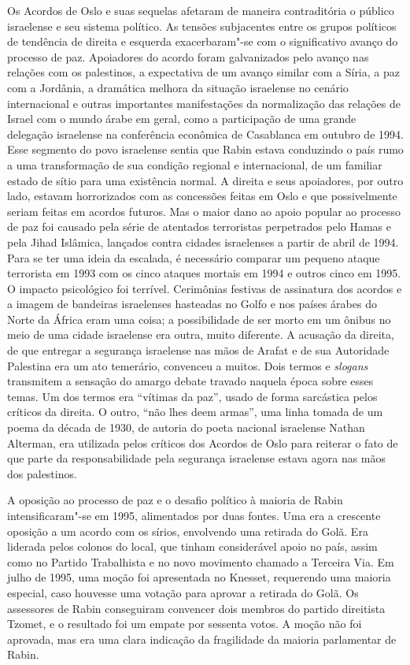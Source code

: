 Os Acordos de Oslo e suas sequelas afetaram de maneira contraditória o
público israelense e seu sistema político. As tensões subjacentes entre
os grupos políticos de tendência de direita e esquerda exacerbaram"-se
com o significativo avanço do processo de paz. Apoiadores do acordo
foram galvanizados pelo avanço nas relações com os palestinos, a
expectativa de um avanço similar com a Síria, a paz com a Jordânia, a
dramática melhora da situação israelense no cenário internacional e
outras importantes manifestações da normalização das relações de Israel
com o mundo árabe em geral, como a participação de uma grande delegação
israelense na conferência econômica de Casablanca em outubro de 1994.
Esse segmento do povo israelense sentia que Rabin estava conduzindo o
país rumo a uma transformação de sua condição regional e internacional,
de um familiar estado de sítio para uma existência normal. A direita e
seus apoiadores, por outro lado, estavam horrorizados com as concessões
feitas em Oslo e que possivelmente seriam feitas em acordos futuros. Mas
o maior dano ao apoio popular ao processo de paz foi causado pela
série de atentados terroristas perpetrados pelo Hamas e pela Jihad
Islâmica, lançados contra cidades israelenses a partir de abril de 1994.
Para se ter uma ideia da escalada, é necessário comparar um pequeno
ataque terrorista em 1993 com os cinco ataques mortais em 1994 e outros
cinco em 1995. O impacto psicológico foi terrível. Cerimônias festivas
de assinatura dos acordos e a imagem de bandeiras israelenses hasteadas
no Golfo e nos países árabes do Norte da África eram uma coisa; a
possibilidade de ser morto em um ônibus no meio de uma cidade israelense
era outra, muito diferente. A acusação da direita, de que entregar a
segurança israelense nas mãos de Arafat e de sua Autoridade Palestina
era um ato temerário, convenceu a muitos. Dois termos e \emph{slogans}
transmitem a sensação do amargo debate travado naquela época sobre esses
temas. Um dos termos era ``vítimas da paz'', usado de forma sarcástica
pelos críticos da direita. O outro, ``não lhes deem armas'', uma linha
tomada de um poema da década de 1930, de autoria do poeta nacional israelense Nathan
Alterman, era utilizada pelos críticos dos Acordos de Oslo para reiterar o
fato de que parte da responsabilidade pela segurança israelense estava
agora nas mãos dos palestinos.

A oposição ao processo de paz e o desafio político à maioria de Rabin
intensificaram"-se em 1995, alimentados por duas fontes. Uma era a
crescente oposição a um acordo com os sírios, envolvendo uma retirada do
Golã. Era liderada pelos colonos do local, que tinham considerável apoio
no país, assim como no Partido Trabalhista e no novo movimento chamado a
Terceira Via. Em julho de 1995, uma moção foi apresentada no Knesset,
requerendo uma maioria especial, caso houvesse uma votação para aprovar
a retirada do Golã. Os assessores de Rabin conseguiram convencer dois
membros do partido direitista Tzomet, e o resultado foi um empate por
sessenta votos. A moção não foi aprovada, mas era uma clara indicação da
fragilidade da maioria parlamentar de Rabin.

